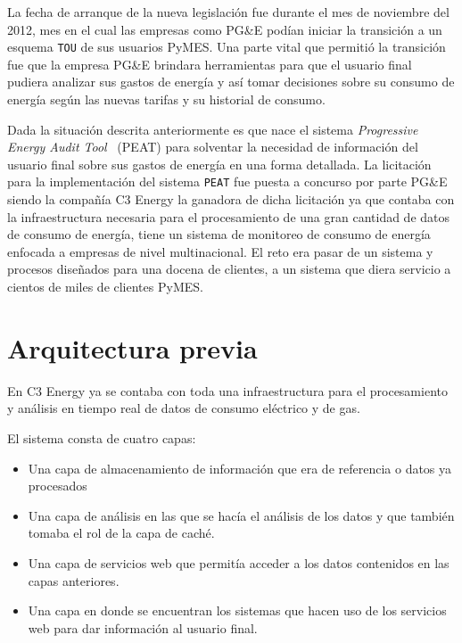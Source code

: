 La fecha de arranque de la nueva legislación fue durante el mes de noviembre
del 2012, mes en el cual las empresas como PG\&E podían iniciar la transición
a un esquema \texttt{TOU} de sus usuarios PyMES.
Una parte vital que permitió la transición fue que la empresa PG\&E brindara
herramientas para que el usuario final pudiera analizar sus gastos de energía
y así tomar decisiones sobre su consumo de energía según las nuevas tarifas
y su historial de consumo.

Dada la situación descrita anteriormente es que nace el sistema
\textit{Progressive Energy Audit Tool} \ (PEAT) para solventar la necesidad
de información del usuario final sobre sus gastos de energía en una forma detallada.
La licitación para la implementación del sistema \texttt{PEAT} fue puesta
a concurso por parte PG\&E siendo la compañía C3 Energy la ganadora de dicha
licitación  ya que contaba con la infraestructura necesaria para el
procesamiento de una gran cantidad de datos de consumo de energía,
tiene un sistema de monitoreo de consumo de energía enfocada a empresas de nivel
multinacional. El reto era pasar de un sistema y procesos diseñados
para una docena de clientes, a un sistema que diera servicio a
cientos de miles de clientes PyMES.

\section{Arquitectura previa}
En C3 Energy ya se contaba con toda una infraestructura para el
procesamiento y análisis en tiempo real de datos de consumo eléctrico
y de gas.

\vspace{2.5mm}

El sistema consta de cuatro capas:

\begin{itemize}
\item Una capa de almacenamiento de información que era de referencia
  o datos ya procesados
\item Una capa de análisis en las que se hacía el análisis de los datos
  y que también tomaba el rol de la capa de caché.
\item Una capa de servicios web que permitía acceder a los datos contenidos
  en las capas anteriores.
\item Una capa en donde se encuentran los sistemas que hacen uso de los
  servicios web para dar información al usuario final.
\end{itemize}

